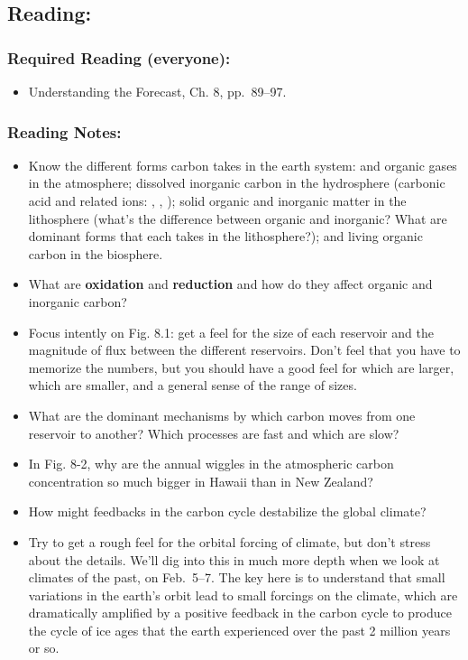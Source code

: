 \documentclass[
]{article}
\providecommand{\tightlist}{%
  \setlength{\itemsep}{0pt}\setlength{\parskip}{0pt}}
\newcommand{\COO}{\ce{CO2}}
\newcommand{\carbonic}{\ce{H2CO3}}
\newcommand{\carbonicacid}{\carbonic}
\newcommand{\carb}{\ce{CO3^2-}}
\newcommand{\bicarb}{\ce{HCO3-}}
\newcommand{\bicarbonate}{\bicarb}
\newcommand{\carbonate}{\carb}
\begin{document}
\hypertarget{reading-9}{%
\subsection{Reading:}\label{reading-9}}

\hypertarget{required-reading-everyone-7}{%
\subsubsection{Required Reading
(everyone):}\label{required-reading-everyone-7}}

\begin{itemize}
\tightlist
\item
  Understanding the Forecast, Ch. 8, pp.~89--97.
\end{itemize}

\hypertarget{reading-notes-7}{%
\subsubsection{Reading Notes:}\label{reading-notes-7}}

\begin{itemize}
\tightlist
\item
  Know the different forms carbon takes in the earth system: \COO and
  organic gases in the atmosphere; dissolved inorganic carbon in the
  hydrosphere (carbonic acid and related ions: \carbonicacid,
  \bicarbonate, \carbonate); solid organic and inorganic matter in the
  lithosphere (what's the difference between organic and inorganic? What
  are dominant forms that each takes in the lithosphere?); and living
  organic carbon in the biosphere.
\item
  What are \textbf{oxidation} and \textbf{reduction} and how do they
  affect organic and inorganic carbon?
\item
  Focus intently on Fig. 8.1: get a feel for the size of each reservoir
  and the magnitude of flux between the different reservoirs. Don't feel
  that you have to memorize the numbers, but you should have a good feel
  for which are larger, which are smaller, and a general sense of the
  range of sizes.
\item
  What are the dominant mechanisms by which carbon moves from one
  reservoir to another? Which processes are fast and which are slow?
\item
  In Fig. 8-2, why are the annual wiggles in the atmospheric carbon
  concentration so much bigger in Hawaii than in New Zealand?
\item
  How might feedbacks in the carbon cycle destabilize the global
  climate?
\item
  Try to get a rough feel for the orbital forcing of climate, but don't
  stress about the details. We'll dig into this in much more depth when
  we look at climates of the past, on Feb.~5--7. The key here is to
  understand that small variations in the earth's orbit lead to small
  forcings on the climate, which are dramatically amplified by a
  positive feedback in the carbon cycle to produce the cycle of ice ages
  that the earth experienced over the past 2 million years or so.
\end{itemize}
\end{document}
